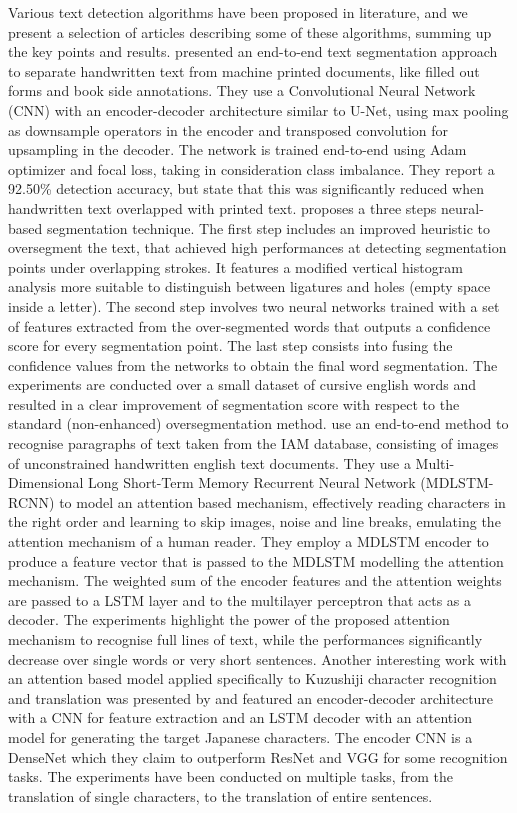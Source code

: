 Various text detection algorithms have  been proposed in literature, and we present a selection of articles describing some of these algorithms, summing up the key points and results. \citeauthor{Jo2019-qb}\cite{Jo2019-qb} presented an end-to-end text segmentation approach to separate handwritten text from machine printed documents, like filled out forms and book side annotations. They use a Convolutional Neural Network (CNN) with an encoder-decoder architecture similar to U-Net, using max pooling as downsample operators in the encoder and transposed convolution for upsampling in the decoder. The network is trained end-to-end using Adam optimizer and focal loss, taking in consideration class imbalance. They report a 92.50\% detection accuracy, but state that this was significantly reduced when handwritten text overlapped with printed text. \citeauthor{Blumenstein2008-we}\cite{Blumenstein2008-we} proposes a three steps neural-based segmentation technique. The first step includes an improved heuristic to oversegment the text, that achieved high performances at detecting segmentation points under overlapping strokes. It features a modified vertical histogram analysis more suitable to distinguish between ligatures and holes (empty space inside a letter). The second step involves two neural networks trained with a set of features extracted from the over-segmented words that outputs a confidence score for every segmentation point. The last step consists into fusing the confidence values from the networks to obtain the final word segmentation. The experiments are conducted over a small dataset of cursive english words and resulted in a clear improvement of segmentation score with respect to the standard (non-enhanced) oversegmentation method. \citeauthor{Bluche2016-pt}\cite{Bluche2016-pt} use an end-to-end method to recognise paragraphs of text taken from the IAM database, consisting of images of unconstrained handwritten english text documents. They use a Multi-Dimensional Long Short-Term Memory Recurrent Neural Network (MDLSTM-RCNN) to model an attention based mechanism, effectively reading characters in the right order and learning to skip images, noise and line breaks, emulating the attention mechanism of a human reader. They employ a MDLSTM encoder to produce a feature vector that is passed to the MDLSTM modelling the attention mechanism. The weighted sum of the encoder features and the attention weights are passed to a LSTM layer and to the multilayer perceptron that acts as a decoder. The experiments highlight the power of the proposed attention mechanism to recognise full lines of text, while the performances significantly decrease over single words or very short sentences. Another interesting work with an attention based model applied specifically to Kuzushiji character recognition and translation was presented by \citeauthor{Clanuwat2018-vm}\cite{Clanuwat2018-vm} and featured an encoder-decoder architecture with a CNN for feature extraction and an LSTM decoder with an attention model for generating the target Japanese characters. The encoder CNN is a DenseNet which they claim to outperform ResNet and VGG for some recognition tasks. The experiments have been conducted on multiple tasks, from the translation of single characters, to the translation of entire sentences. 